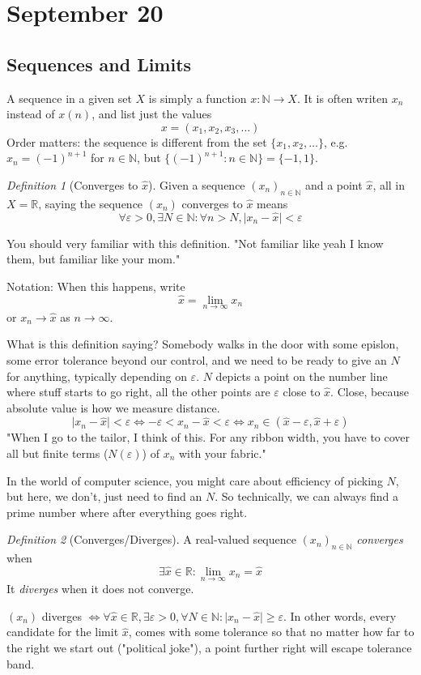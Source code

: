 \documentclass{article}
\theoremstyle{plain}
\theoremstyle{remark}
\newtheorem{definition}{Definition}
\newcommand{\N}{{\mathbb N}}
\newcommand{\R}{{\mathbb R}}
\newcommand{\ep}{{\varepsilon}}
\begin{document}
\section{September 20}
\subsection{Sequences and Limits}
A sequence in a given set $X$ is simply a function $x \colon \N \to X$.
It is often writen $x_n$ instead of $x(n)$, and list just the values
\[x = (x_1,x_2,x_3,\dots)\]
Order matters: the sequence is different from the set $\{x_1,x_2,\dots\}$,
e.g. $x_n = (-1)^{n+1}$ for $n \in \N$,
but $\{(-1)^{n+1} \colon n\in\N\} = \{-1,1\}$.

\begin{definition}[Converges to $\hat{x}$]
Given a sequence $(x_n)_{n\in\N}$ and a point $\hat{x}$,
all in $X = \R$, saying the sequence $(x_n)$ converges to $\hat{x}$ means
\[\forall \ep>0, \exists N \in \N \colon \forall n > N, \lvert x_n - \hat{x} \rvert < \ep\]
\end{definition}
You should very familiar with this definition.
"Not familiar like yeah I know them,
but familiar like your mom."

Notation: When this happens, write
\[\hat{x} = \lim_{n\to\infty} x_n\]
or $x_n \to \hat{x}$ as $n \to \infty$.

What is this definition saying?
Somebody walks in the door with some epislon,
some error tolerance beyond our control,
and we need to be ready to give an $N$ for anything,
typically depending on $\ep$.
$N$ depicts a point on the number line where stuff starts to go right,
all the other points are $\ep$ close to $\hat{x}$.
Close, because absolute value is how we measure distance.
\[\lvert x_n - \hat{x} \rvert < \ep
\iff -\ep < x_n - \hat{x} < \ep
\iff x_n \in (\hat{x}-\ep, \hat{x}+\ep)\]
"When I go to the tailor, I think of this.
For any ribbon width,
you have to cover all but finite terms ($N(\ep)$) of $x_n$
with your fabric."

In the world of computer science, you might care about efficiency of picking $N$,
but here, we don't, just need to find an $N$.
So technically, we can always find a prime number where after everything goes right.

\begin{definition}[Converges/Diverges]
A real-valued sequence $(x_n)_{n\in\N}$ {\it converges} when
\[\exists \hat{x} \in \R \colon \lim_{n\to\infty} x_n = \hat{x}\]
It {\it diverges} when it does not converge.
\end{definition}
$(x_n)$ diverges $\iff \forall \hat{x} \in \R, \exists \ep>0, \forall N\in\N
\colon \lvert x_n - \hat{x} \rvert \geq \ep$.
In other words,
every candidate for the limit $\hat{x}$,
comes with some tolerance
so that no matter how far to the right we start out ("political joke"),
a point further right will escape tolerance band.
\end{document}
